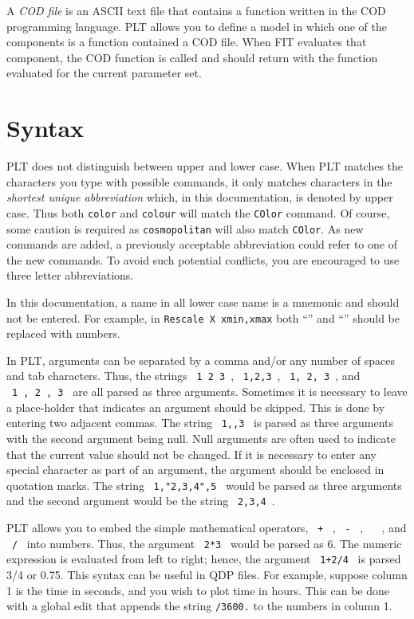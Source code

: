 A {\it COD file} is an ASCII text file
that contains a function written in the COD programming language.
PLT allows you to define a model in which one of the components
is a function contained a COD file.
When FIT evaluates that component,
the COD function is called and should return
with the function evaluated for the current parameter set.

\section{Syntax}

PLT does not distinguish between upper and lower case.
When PLT matches the characters you type with possible commands,
it only matches characters in the {\em shortest unique abbreviation}
which, in this documentation, is denoted by upper case.
Thus both {\tt color} and {\tt colour} will match the {\tt COlor}
command.
Of course, some caution is required as {\tt cosmopolitan} will also
match {\tt COlor}.
As new commands are added, a previously acceptable abbreviation
could refer to one of the new commands.
To avoid such potential conflicts,
you are encouraged to use three letter abbreviations.

In this documentation, a name in all lower case name is a mnemonic
and should not be entered.
For example, in {\tt Rescale X xmin,xmax} both ``\verb@xmin@'' and
``\verb@xmax@'' should be replaced with numbers.

In PLT, arguments can be separated by a comma and/or any number of
spaces and tab characters.
Thus, the strings \ {\tt 1~2~3}~, \ {\tt 1,2,3}~, \ {\tt 1,~2,~3}~,
and \ {\tt 1~,~2~,~3 } are all parsed as three arguments.
Sometimes it is necessary to leave a place-holder that indicates an
argument should be skipped.
This is done by entering two adjacent commas.
The string \ {\tt 1,,3} \ is parsed as three arguments with the
second argument being null.
Null arguments are often used to indicate that the current value should
not be changed.
If it is necessary to enter any special character as part of an
argument, the argument should be enclosed in quotation marks.
The string \ {\tt 1,"2,3,4",5} \ would be parsed as three arguments
and the second argument would be the string \ {\tt 2,3,4}\ .

PLT allows you to embed the simple mathematical operators,
\ {\tt +} \ , \ {\tt -} \ , \ {\tt *} \ , and \ {\tt /} \ into numbers.
Thus, the argument \ {\tt 2*3} \ would be parsed as 6.
The numeric expression is evaluated from left to right;
hence, the argument \ {\tt 1+2/4} \ is parsed 3/4 or 0.75.
This syntax can be useful in QDP files.
For example, suppose column 1 is the time in seconds,
and you wish to plot time in hours.
This can be done with a global edit
that appends the string {\tt /3600.} to the numbers in column 1.

